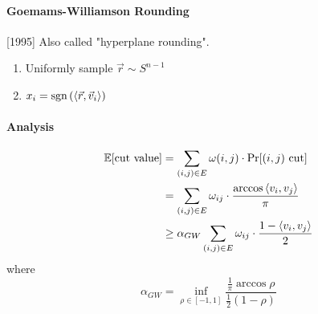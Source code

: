 \paragraph{Goemams-Williamson Rounding}[1995]
Also called "hyperplane rounding".

\begin{enumerate}
    \item Uniformly sample  $ \vec{r}\sim S^{n-1} $
    \item  $ x_i=\mathrm{sgn}\left(\left<\vec{r},\vec{v}_i\right>\right) $  
\end{enumerate}

\paragraph{Analysis}
\[\begin{aligned}
    \mathbb E[\text{cut value}]&=\sum_{(i,j)\in E}\omega(i,j)\cdot\mathrm{Pr}[(i,j)\text{ cut}]\\
    &=\sum_{(i,j)\in E}\omega_{ij}\cdot\frac{\arccos\left<v_i,v_j\right>}{\pi}\\
    & \geq \alpha_{GW}\sum_{(i,j)\in E}\omega_{ij}\cdot\frac{1-\left<v_i,v_j\right>}{2}
\end{aligned}\]
where 
\[\alpha_{GW}=\inf_{\rho\in[-1,1]}\frac{\frac{1}{\pi}\arccos\rho}{\frac{1}{2}(1-\rho)}\]
